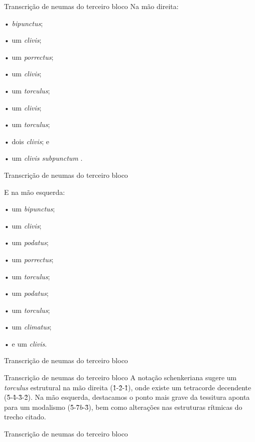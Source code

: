 \documentclass[aspectratio=169]{beamer}
\begin{document}
\begin{frame}{Transcrição de neumas do terceiro bloco}\label{fig:neumaMD3}
Na mão direita:

• \emph{bipunctus};

• um \emph{clivis};

• um \emph{porrectus};

• um \emph{clivis}; 

• um \emph{torculus};

• um \emph{clivis};

• um \emph{torculus};

• dois \emph{clivis}; e

• um \emph{clivis subpunctum} . 
\end{frame}

\begin{frame}{Transcrição de neumas do terceiro bloco}

E na mão esquerda:

• um \emph{bipunctus};

• um \emph{clivis};

• um \emph{podatus};

• um \emph{porrectus}; 

• um \emph{torculus};

• um \emph{podatus};

• um \emph{torculus};

• um \emph{climatus};

• e um \emph{clivis}.
\end{frame}

\begin{frame}{Transcrição de neumas do terceiro bloco}
  \centering{}
\end{frame}

\begin{frame}{Transcrição de neumas do terceiro bloco}
  A notação schenkeriana sugere um \emph{torculus} estrutural na mão direita (\^1-\^2-\^1), onde existe um tetracorde decendente (\^5-\^4-\^3-\^2). Na mão esquerda, destacamos o ponto mais grave da tessitura aponta para um modalismo (\^5-\^7$b$-\^3), bem como alterações nas estruturas rítmicas do trecho citado.
\end{frame}

\begin{frame}{Transcrição de neumas do terceiro bloco}
  \centering{}
\end{frame}
\end{document}

